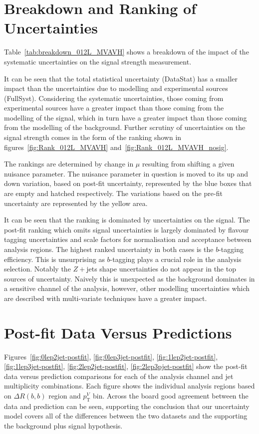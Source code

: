 \section{Breakdown and Ranking of Uncertainties}
Table~\ref{tab:breakdown_012L_MVAVH} shows a breakdown of the impact of the
systematic uncertainties on the signal strength measurement.

It can be seen that the total statistical uncertainty (DataStat) has a smaller
impact than the uncertainties due to modelling and experimental sources
(FullSyst). Considering the systematic uncertainties, those coming from
experimental sources have a greater impact than those coming from the modelling
of the signal, which in turn have a greater impact than those coming from the
modelling of the background. Further scrutiny of uncertainties on the signal
strength comes in the form of the ranking shown in
figures~\ref{fig:Rank_012L_MVAVH} and~\ref{fig:Rank_012L_MVAVH_nosig}.

The rankings are determined by change in $\mu$ resulting from shifting a given
nuisance parameter. The nuisance parameter in question is moved to its up and
down variation, based on post-fit uncertainty, represented by the blue boxes
that are empty and hatched respectively. The variations based on the pre-fit
uncertainty are represented by the yellow area.

It can be seen that the ranking is dominated by uncertainties on the signal. The
post-fit ranking which omits signal uncertainties is largely dominated by
flavour tagging uncertainties and scale factors for normalisation and acceptance
between analysis regions. The highest ranked uncertainty in both cases is the
$b$-tagging efficiency. This is unsurprising as $b$-tagging plays a crucial role
in the analysis selection. Notably the $Z+$jets shape uncertainties do not
appear in the top sources of uncertainty. Naively this is unexpected as the
background dominates in a sensitive channel of the analysis, however, other
modelling uncertainties which are described with multi-variate techniques have a
greater impact.

\section{Post-fit Data Versus Predictions}
Figures~\ref{fig:0lep2jet-postfit}, \ref{fig:0lep3jet-postfit},
\ref{fig:1lep2jet-postfit}, \ref{fig:1lep3jet-postfit},
\ref{fig:2lep2jet-postfit}, \ref{fig:2lep3pjet-postfit} show the post-fit data
versus prediction comparisons for each of the analysis channel and jet
multiplicity combinations. Each figure shows the individual analysis regions
based on $\Delta R(b, b)$ region and $p_{\mathrm{T}}^V$ bin. Across the board
good agreement between the data and prediction can be seen, supporting the
conclusion that our uncertainty model covers all of the differences between the
two datasets and the supporting the background plus signal hypothesis.







